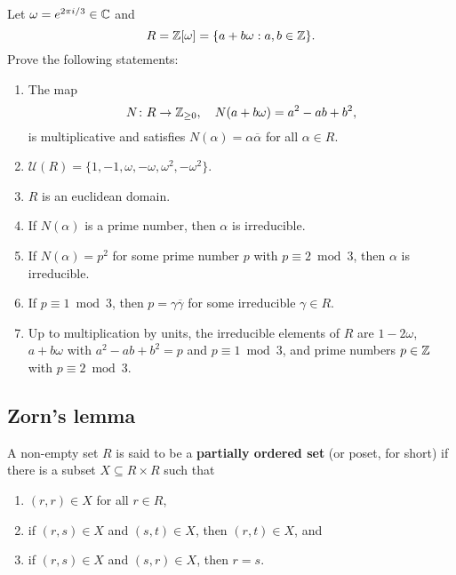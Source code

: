 \begin{exercise}
    \label{xca:Eisenstein}
    Let $\omega=e^{2\pi i/3}\in\mathbb{C}$ and 
    \[
    R=\mathbb{Z}[\omega]=\{a+b\omega:a,b\in\mathbb{Z}\}.
    \]
    Prove the following statements:
    \begin{enumerate}
        \item The map 
        \[
        N\colon R\to\mathbb{Z}_{\geq0},
        \quad
        N(a+b\omega)=a^2-ab+b^2,
        \]
        is multiplicative and 
        satisfies $N(\alpha)=\alpha\overline{\alpha}$
        for all $\alpha\in R$. 
        \item $\mathcal{U}(R)=\{1,-1,\omega,-\omega,\omega^2,-\omega^2\}$.
        \item $R$ is an euclidean domain.
        \item If $N(\alpha)$ is a prime number, then $\alpha$ is irreducible. 
        \item If $N(\alpha)=p^2$ for some 
            prime number $p$ with $p\equiv 2\bmod 3$, then 
            $\alpha$ is irreducible. 
        \item If $p\equiv 1\bmod 3$, then 
            $p=\gamma\overline{\gamma}$ for some 
            irreducible $\gamma\in R$.
        \item Up to multiplication by units, 
            the irreducible elements of $R$ are $1-2\omega$, 
            $a+b\omega$ with $a^2-ab+b^2=p$ and $p\equiv 1\bmod 3$, 
            and prime numbers $p\in\mathbb{Z}$ with $p\equiv 2\bmod 3$.
    \end{enumerate}
\end{exercise}


\subsection{Zorn's lemma}

\begin{definition}
A non-empty set $R$ is said to be a \textbf{partially ordered set} (or poset, for short) 
if there is a subset $X\subseteq R\times R$ such that
\begin{enumerate}
    \item $(r,r)\in X$ for all $r\in R$, 
    \item if $(r,s)\in X$ and $(s,t)\in X$, then $(r,t)\in X$, and 
    \item if $(r,s)\in X$ and $(s,r)\in X$, then $r=s$. 
\end{enumerate}
\end{definition}

